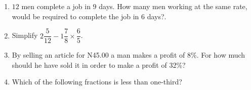 \begin{multicols}{2}
\begin{enumerate}[label={\arabic*.}]
\begin{enumerate}[label={\Alph*.}]
    \end{enumerate}
\item \(12\) men complete a job in \(9\) days. How many men working at the same rate, would be required to complete the job in \(6\) days?. 
    \begin{enumerate}[label={\Alph*.}]
    \end{enumerate}
\item Simplify \(2{\dfrac{5}{12}} - 1{\dfrac{7}{8}} \times \dfrac{6}{5}\).
    \begin{enumerate}[label={\Alph*.}]
    \end{enumerate}
\item By selling an article for N45.00 a man makes a profit of \(8\%\). For how much should he have sold it in order to make a profit of 32\%? 
    \begin{enumerate}[label={\Alph*.}]
    \end{enumerate}
\item Which of the following fractions is less than one-third?
    \begin{enumerate}[label={\Alph*.}]

\end{enumerate}
\end{enumerate}
\end{multicols}
